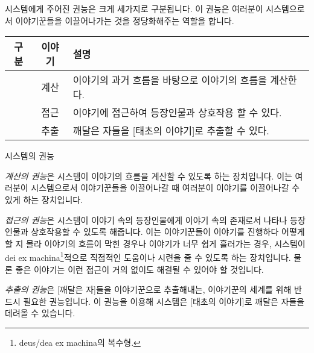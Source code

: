 \documentclass{report}
\begin{document}
	\bigskip
	
	시스템에게 주어진 권능은 크게 세가지로 구분됩니다. 이 권능은 여러분이 시스템으로서 이야기꾼들을 이끌어나가는 것을 정당화해주는 역할을 합니다.
	
	\smallskip
	
	\begin{minipage}{\textwidth}
		\begin{tabularx}{\textwidth}{c|c|X}
			\hline
			\textbf{구분} & \textbf{이야기} & \textbf{설명} \\ \hline \hline
			[권능:시스템] & 계산\index{계산} & 이야기의 과거 흐름을 바탕으로 이야기의 흐름을 계산한다. \\ \hline
			[권능:시스템] & 접근\index{접근} & 이야기에 접근하여 등장인물과 상호작용 할 수 있다. \\ \hline
			[권능:시스템] & 추출\index{추출} & 깨달은 자들을 [태초의 이야기]로 추출할 수 있다. \\ \hline
		\end{tabularx}
		\begin{center}
			시스템의 권능
		\end{center}
	\end{minipage}
	
	\bigskip
	
	\emph{계산의 권능}은 시스템이 이야기의 흐름을 계산할 수 있도록 하는 장치입니다. 이는 여러분이 시스템으로서 이야기꾼들을 이끌어나갈 때 여러분이 이야기를 이끌어나갈 수 있게 하는 장치입니다.
	
	\smallskip
	
	\emph{접근의 권능}은 시스템이 이야기 속의 등장인물에게 이야기 속의 존재로서 나타나 등장인물과 상호작용할 수 있도록 해줍니다. 이는 이야기꾼들이 이야기를 진행하다 어떻게 할 지 몰라 이야기의 흐름이 막힌 경우나 이야기가 너무 쉽게 흘러가는 경우, 시스템이 dei ex machina\footnote{deus/dea ex machina의 복수형.}적으로 직접적인 도움이나 시련을 줄 수 있도록 하는 장치입니다. 물론 좋은 이야기는 이런 접근이 거의 없이도 해결될 수 있어야 할 것입니다.
	
	\smallskip
	
	\emph{추출의 권능}은 [깨달은 자]들을 이야기꾼으로 추출해내는, 이야기꾼의 세계를 위해 반드시 필요한 권능입니다. 이 권능을 이용해 시스템은 [태초의 이야기]로 깨달은 자들을 데려올 수 있습니다.
\end{document}
